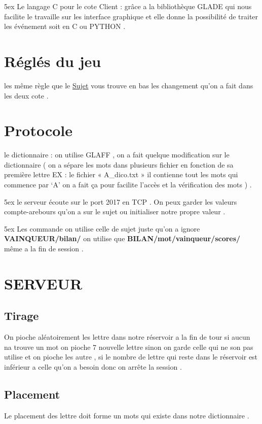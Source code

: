 \documentclass[french]{article}
\begin{document}
\noindent
\setlength { \parindent } {5ex }
        Le langage C pour le cote Client : grâce a la bibliothèque GLADE qui nous facilite le
travaille sur les interface graphique et elle donne la possibilité de traiter les événement soit
en C ou PYTHON .

\section{ Réglés du jeu}
    les même règle que le \href{https://www-apr.lip6.fr/~chaillou/Public/enseignement/2016-2017/pc2r/public/projet-16-3.pdf}{Sujet}  vous trouve en bas les changement qu’on a fait dans les
deux cote . 
 
\section{Protocole} 
    le dictionnaire : on utilise GLAFF , on a fait quelque modification sur le dictionnaire
( on a sépare les mots dans plusieurs fichier en fonction de sa première lettre EX : le fichier
« A\_dico.txt » il contienne tout les mots qui commence par ‘A’ on a fait ça pour facilite
l'accès et la vérification des mots ) .

\noindent
\setlength { \parindent } {5ex }
    le serveur écoute sur le port 2017 en TCP . On peux garder les valeurs compte-arebours
qu’on a sur le sujet ou initialiser notre propre valeur .

\noindent
\setlength { \parindent } {5ex }
    Les commande on utilise celle de sujet juste qu’on a ignore \textbf{VAINQUEUR/bilan/}
on utilise que \textbf{BILAN/mot/vainqueur/scores/} même a la fin de session .

\section{ SERVEUR }
\subsection{ Tirage }
    On pioche aléatoirement les lettre dans notre réservoir a la fin de tour si aucun na
trouve un mot on pioche 7 nouvelle lettre sinon on garde celle qui ne son pas utilise et on
pioche les autre , si le nombre de lettre qui reste dans le réservoir est inférieur a celle qu’on
a besoin donc on arrête la session .

\subsection{ Placement  }
    Le placement des lettre doit forme un mots qui existe dans notre dictionnaire .
    
\end{document}
